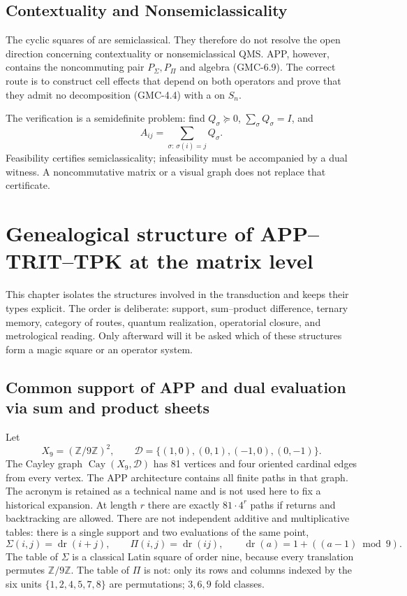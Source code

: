 \subsection{Contextuality and Nonsemiclassicality}

The cyclic squares of  are semiclassical. They therefore do not
resolve the open direction concerning contextuality or nonsemiclassical
QMS. APP, however, contains the noncommuting pair $P_\Sigma,P_\Pi$
and algebra \textup{(GMC-6.9)}. The correct route is to construct cell effects that
depend on both operators and prove that they admit no decomposition
\textup{(GMC-4.4)} with a \POVM on $S_n$.

The verification is a semidefinite problem: find
$Q_\sigma\succeq0$, $\sum_\sigma Q_\sigma=I$, and
\[
 A_{ij}=\sum_{\sigma:\,\sigma(i)=j}Q_\sigma.
 \tag{GMC-8.6}
\]
Feasibility certifies semiclassicality; infeasibility must be accompanied by
a dual witness. A noncommutative matrix or a visual graph does not replace
that certificate.


\section{Genealogical structure of APP--TRIT--TPK at the matrix level}
\label{p12-83-c22-s6:gmc:chap:hmt-profundidad}

This chapter isolates the structures involved in the transduction and keeps their types explicit. The order is deliberate: support, sum--product difference, ternary memory, category of routes, quantum realization, operatorial closure, and metrological reading. Only afterward will it be asked which of these structures form a magic square or an operator system.

\subsection{Common support of APP and dual evaluation via sum and product sheets}

Let
\[
 X_9=(\mathbb Z/9\mathbb Z)^2,
 \qquad
 \mathscr D=\{(1,0),(0,1),(-1,0),(0,-1)\}.
\]
The Cayley graph $\operatorname{Cay}(X_9,\mathscr D)$ has 81 vertices and four oriented cardinal edges from every vertex. The APP architecture contains all finite paths in that graph. The acronym is retained as a technical name and is not used here to fix a historical expansion. At length $r$ there are exactly $81\cdot4^r$ paths if returns and backtracking are allowed. There are not independent additive and multiplicative tables: there is a single support and two evaluations of the same point,
\[
 \Sigma(i,j)=\operatorname{dr}(i+j),
 \qquad
 \Pi(i,j)=\operatorname{dr}(ij),
 \qquad
 \operatorname{dr}(a)=1+((a-1)\bmod9).
 \tag{GMC-2.1}
\]
The table of $\Sigma$ is a classical Latin square of order nine, because
every translation permutes $\mathbb Z/9\mathbb Z$. The table of $\Pi$ is not:
only its rows and columns indexed by the six units
$\{1,2,4,5,7,8\}$ are permutations; $3,6,9$ fold classes.

